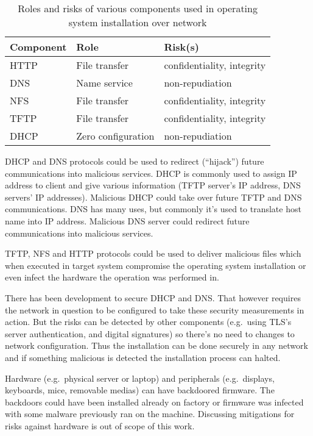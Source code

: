\begin{table}[!ht]
  \def\arraystretch{1.1}%
  \begin{center}
   \caption{Roles and risks of various components used in operating
      system installation over network}
    \begin{tabular}{| l | l | l |}
      \hline
      Component   & Role               & Risk(s)                    \\
      \hline
      HTTP        & File transfer      & confidentiality, integrity \\
      DNS         & Name service       & non-repudiation            \\
      NFS         & File transfer      & confidentiality, integrity \\
      TFTP        & File transfer      & confidentiality, integrity \\
      DHCP        & Zero configuration & non-repudiation            \\
      \hline
    \end{tabular}
    \label{tab:risks_table}
  \end{center}
\end{table}

DHCP and DNS protocols could be used to redirect (``hijack'') future
communications into malicious services. DHCP is commonly used to
assign IP address to client and give various information (TFTP
server's IP address, DNS servers' IP addresses). Malicious DHCP could
take over future TFTP and DNS communications. DNS has many uses, but
commonly it's used to translate host name into IP address. Malicious
DNS server could redirect future communications into malicious
services.

TFTP, NFS and HTTP protocols could be used to deliver malicious files
which when executed in target system compromise the operating system
installation or even infect the hardware the operation was performed
in.

There has been development to secure DHCP and DNS. That however
requires the network in question to be configured to take these
security measurements in action. But the risks can be detected by
other components (e.g.\ using TLS's server authentication, and digital
signatures) so there's no need to changes to network
configuration. Thus the installation can be done securely in any
network and if something malicious is detected the installation
process can halted.

Hardware (e.g.\ physical server or laptop) and peripherals (e.g.\
displays, keyboards, mice, removable medias) can have backdoored
firmware. The backdoors could have been installed already on factory
or firmware was infected with some malware previously ran on the
machine. Discussing mitigations for risks against hardware is out of
scope of this work.



